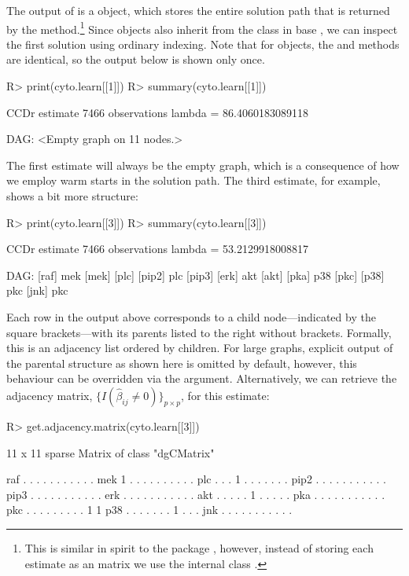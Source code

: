 \documentclass[article]{jss}
\newcommand{\dagcomp}{\beta}
\newcommand{\dagcompest}{\widehat{\dagcomp}}
\renewcommand{\|}{\,|\,}
\begin{document}
The output of  is a  object, which stores the entire solution path that is returned by the method.\footnote{This is similar in spirit to the  package \citep{friedman2014}, however, instead of storing each estimate as an  matrix we use the internal class .} Since  objects also inherit from the  class in base , we can inspect the first solution using ordinary  indexing. Note that for  objects, the  and  methods are identical, so the output below is shown only once.
%
\begin{CodeChunk}
\begin{CodeInput}
R> print(cyto.learn[[1]])
R> summary(cyto.learn[[1]])
\end{CodeInput}
\begin{CodeOutput}
CCDr estimate
7466 observations
lambda = 86.4060183089118

DAG: 
<Empty graph on 11 nodes.>
\end{CodeOutput}
\end{CodeChunk}
%
The first estimate will always be the empty graph, which is a consequence of how we employ warm starts in the solution path. The third estimate, for example, shows a bit more structure:
%
\begin{CodeChunk}
\begin{CodeInput}
R> print(cyto.learn[[3]])
R> summary(cyto.learn[[3]])
\end{CodeInput}
\begin{CodeOutput}
CCDr estimate
7466 observations
lambda = 53.2129918008817

DAG: 
[raf]   mek   
[mek]    
[plc]    
[pip2]  plc   
[pip3]   
[erk]   akt   
[akt]    
[pka]   p38   
[pkc]    
[p38]   pkc   
[jnk]   pkc 
\end{CodeOutput}
\end{CodeChunk}
%
Each row in the output above corresponds to a child node---indicated by the square brackets---with its parents listed to the right without brackets. Formally, this is an adjacency list ordered by children.
For large graphs, explicit output of the parental structure as shown here is omitted by default, however, this behaviour can be overridden via the  argument. Alternatively, we can retrieve the adjacency matrix, $\{I(\dagcompest_{ij}\ne 0)\}_{p\times p}$, for this estimate:
%
\begin{CodeChunk}
\begin{CodeInput}
R> get.adjacency.matrix(cyto.learn[[3]])
\end{CodeInput}
\begin{CodeOutput}
11 x 11 sparse Matrix of class "dgCMatrix"
                           
raf  . . . . . . . . . . .
mek  1 . . . . . . . . . .
plc  . . . 1 . . . . . . .
pip2 . . . . . . . . . . .
pip3 . . . . . . . . . . .
erk  . . . . . . . . . . .
akt  . . . . . 1 . . . . .
pka  . . . . . . . . . . .
pkc  . . . . . . . . . 1 1
p38  . . . . . . . 1 . . .
jnk  . . . . . . . . . . .
\end{CodeOutput}
\end{CodeChunk}
\end{document}
